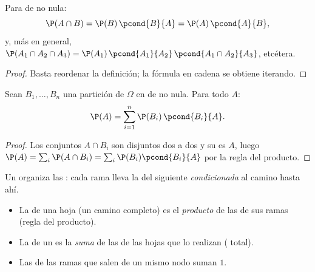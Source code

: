 \begin{proposition}\label{prop:g12:condprob:product}
Para  de  no nula:
\[
\P(A \cap B) = \P(B)\,\pcond{B}{A} = \P(A)\,\pcond{A}{B},
\]
y, más en general,
$\P(A_1 \cap A_2 \cap A_3) = \P(A_1)\,\pcond{A_1}{A_2}\,
\pcond{A_1 \cap A_2}{A_3}$, etcétera.
\end{proposition}

\begin{proof}
Basta reordenar la definición; la fórmula en cadena se obtiene iterando.
\end{proof}

\begin{theorem}\label{thm:g12:condprob:total}
Sean $B_1, \dots, B_n$ una partición de $\Omega$ en  de 
no nula. Para todo  $A$:
\[
\P(A) = \sum_{i=1}^{n} \P(B_i)\,\pcond{B_i}{A}.
\]
\end{theorem}

\begin{proof}
Los conjuntos $A \cap B_i$ son disjuntos dos a dos y su  es $A$, luego
$\P(A) = \sum_i \P(A \cap B_i) = \sum_i \P(B_i)\pcond{B_i}{A}$ por la regla
del producto.
\end{proof}

\begin{method}\label{met:g12:condprob:tree}
Un  organiza las : cada rama
lleva la  del  siguiente \emph{condicionada} al camino
 hasta ahí.
\begin{itemize}
  \item La  de una hoja (un camino completo) es el
        \emph{producto} de las  de sus ramas (regla del
        producto).
  \item La  de un  es la \emph{suma} de las
         de las hojas que lo realizan ( total).
  \item Las  de las ramas que salen de un mismo nodo suman
        $1$.
\end{itemize}
\end{method}

